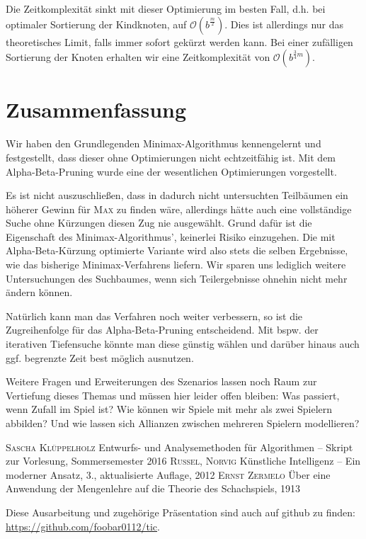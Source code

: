 \documentclass[a4paper]{scrartcl}
\newcommand\q[1]{\glqq #1\grqq}
\begin{document}
Die Zeitkomplexität sinkt mit dieser Optimierung im besten Fall, d.h. bei optimaler Sortierung der Kindknoten, auf $\mathcal{O}(b^{\frac{m}{2}})$. Dies ist allerdings nur das theoretisches Limit, falls immer sofort gekürzt werden kann. Bei einer zufälligen Sortierung der Knoten erhalten wir eine Zeitkomplexität von $\mathcal{O}(b^{\frac{3}{4}m})$.


\section{Zusammenfassung}

Wir haben den Grundlegenden Minimax-Algorithmus kennengelernt und festgestellt, dass dieser ohne Optimierungen nicht echtzeitfähig ist. Mit dem Alpha-Beta-Pruning wurde eine der wesentlichen Optimierungen vorgestellt.

Es ist nicht auszuschließen, dass in dadurch nicht untersuchten Teilbäumen ein höherer Gewinn für \textsc{Max} zu finden wäre, allerdings hätte auch eine vollständige Suche ohne Kürzungen diesen Zug nie ausgewählt. Grund dafür ist die Eigenschaft des Minimax-Algorithmus', keinerlei Risiko einzugehen. Die mit Alpha-Beta-Kürzung optimierte Variante wird also stets die selben Ergebnisse, wie das bisherige Minimax-Verfahrens liefern. Wir sparen uns lediglich weitere Untersuchungen des Suchbaumes, wenn sich Teilergebnisse ohnehin nicht mehr ändern können.

Natürlich kann man das Verfahren noch weiter verbessern, so ist die Zugreihenfolge für das Alpha-Beta-Pruning entscheidend. Mit bspw. der iterativen Tiefensuche könnte man diese günstig wählen und darüber hinaus auch ggf. begrenzte Zeit best möglich ausnutzen.

Weitere Fragen und Erweiterungen des Szenarios lassen noch Raum zur Vertiefung dieses Themas und müssen hier leider offen bleiben: Was passiert, wenn Zufall im Spiel ist? Wie können wir Spiele mit mehr als zwei Spielern abbilden? Und wie lassen sich Allianzen zwischen mehreren Spielern modellieren?


\begin{thebibliography}{99}
   \textsc{Sascha Klüppelholz}
  \newblock \q{Entwurfs- und Analysemethoden für Algorithmen -- Skript zur Vorlesung}, Sommersemester 2016
   \textsc{Russel, Norvig}
  \newblock \q{Künstliche Intelligenz -- Ein moderner Ansatz}, 3., aktualisierte Auflage, 2012
   \textsc{Ernst Zermelo}
  \newblock \q{Über eine Anwendung der Mengenlehre auf die Theorie des Schachspiels}, 1913
\end{thebibliography}


\vspace{4\baselineskip}
Diese Ausarbeitung und zugehörige Präsentation sind auch auf github zu finden: \\\url{https://github.com/foobar0112/tic}.
\end{document}
